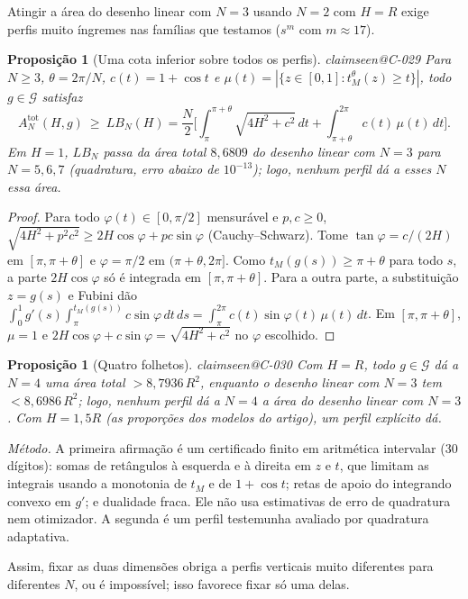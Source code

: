 \documentclass[11pt,a4paper]{article}
\makeatletter
\theoremstyle{plain}
\newtheorem{proposition}[theorem]{Proposição}
\theoremstyle{remark}
\newcommand{\claim}[1]{\ifcsname claimseen@#1\endcsname\else\expandafter\gdef\csname claimseen@#1\endcsname{}\label{claim:#1}\fi}
\makeatother
\begin{document}
Atingir a área do desenho linear com $N=3$ usando $N=2$ com $H=R$ exige perfis muito íngremes nas famílias que testamos ($s^m$
com $m\approx17$).

\begin{proposition}[Uma cota inferior sobre todos os perfis]\label{prop:lower}\claim{C-029}
Para $N\ge3$, $\theta=2\pi/N$, $c(t)=1+\cos t$ e $\mu(t)=|\{z\in[0,1]: t_M^\theta(z)\ge t\}|$, todo $g\in\mathcal G$ satisfaz
\[ A^{\mathrm{tot}}_N(H,g)\ \ge\ LB_N(H)=\frac N2\Big[\int_\pi^{\pi+\theta}\!\sqrt{4H^2+c^2}\,dt+\int_{\pi+\theta}^{2\pi}c(t)\,\mu(t)\,dt\Big]. \]
Em $H=1$, $LB_N$ passa da área total $8{,}6809$ do desenho linear com $N=3$ para $N=5,6,7$ (quadratura, erro abaixo de
$10^{-13}$); logo, nenhum perfil dá a esses $N$ essa área.
\end{proposition}
\begin{proof}
Para todo $\varphi(t)\in[0,\pi/2]$ mensurável e $p,c\ge0$, $\sqrt{4H^2+p^2c^2}\ge2H\cos\varphi+pc\sin\varphi$ (Cauchy--Schwarz).
Tome $\tan\varphi=c/(2H)$ em $[\pi,\pi+\theta]$ e $\varphi=\pi/2$ em $(\pi+\theta,2\pi]$. Como $t_M(g(s))\ge\pi+\theta$ para
todo $s$, a parte $2H\cos\varphi$ só é integrada em $[\pi,\pi+\theta]$. Para a outra parte, a substituição $z=g(s)$ e Fubini
dão $\int_0^1g'(s)\int_\pi^{t_M(g(s))}c\sin\varphi\,dt\,ds=\int_\pi^{2\pi}c(t)\sin\varphi(t)\,\mu(t)\,dt$. Em $[\pi,\pi+\theta]$,
$\mu=1$ e $2H\cos\varphi+c\sin\varphi=\sqrt{4H^2+c^2}$ no $\varphi$ escolhido.
\end{proof}

\begin{proposition}[Quatro folhetos]\label{prop:four}\claim{C-030}
Com $H=R$, todo $g\in\mathcal G$ dá a $N=4$ uma área total $>8{,}7936\,R^2$, enquanto o desenho linear com $N=3$ tem
$<8{,}6986\,R^2$; logo, nenhum perfil dá a $N=4$ a área do desenho linear com $N=3$. Com $H=1{,}5R$ (as proporções dos modelos
do artigo), um perfil explícito dá.
\end{proposition}
\noindent\emph{Método.} A primeira afirmação é um certificado finito em aritmética intervalar (30 dígitos): somas de
retângulos à esquerda e à direita em $z$ e $t$, que limitam as integrais usando a monotonia de $t_M$ e de $1+\cos t$; retas de
apoio do integrando convexo em $g'$; e dualidade fraca. Ele não usa estimativas de erro de quadratura nem otimizador. A segunda
é um perfil testemunha avaliado por quadratura adaptativa.

Assim, fixar as duas dimensões obriga a perfis verticais muito diferentes para diferentes $N$, ou é impossível; isso favorece
fixar só uma delas.
\end{document}
